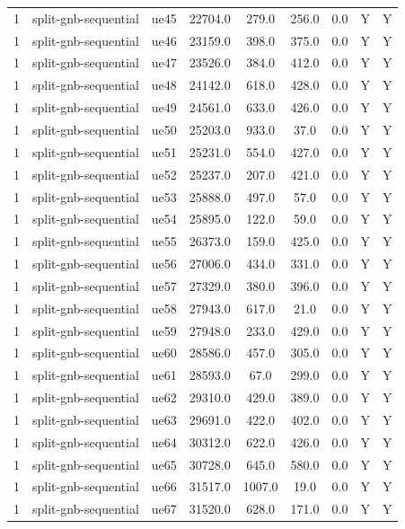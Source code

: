 \begin{table}[ht]
\begin{tabular}{|c|c|c|c|c|c|c|c|c|}
1 & split-gnb-sequential & ue45 & 22704.0 & 279.0 & 256.0 & 0.0 & Y & Y \\
1 & split-gnb-sequential & ue46 & 23159.0 & 398.0 & 375.0 & 0.0 & Y & Y \\
1 & split-gnb-sequential & ue47 & 23526.0 & 384.0 & 412.0 & 0.0 & Y & Y \\
1 & split-gnb-sequential & ue48 & 24142.0 & 618.0 & 428.0 & 0.0 & Y & Y \\
1 & split-gnb-sequential & ue49 & 24561.0 & 633.0 & 426.0 & 0.0 & Y & Y \\
1 & split-gnb-sequential & ue50 & 25203.0 & 933.0 & 37.0 & 0.0 & Y & Y \\
1 & split-gnb-sequential & ue51 & 25231.0 & 554.0 & 427.0 & 0.0 & Y & Y \\
1 & split-gnb-sequential & ue52 & 25237.0 & 207.0 & 421.0 & 0.0 & Y & Y \\
1 & split-gnb-sequential & ue53 & 25888.0 & 497.0 & 57.0 & 0.0 & Y & Y \\
1 & split-gnb-sequential & ue54 & 25895.0 & 122.0 & 59.0 & 0.0 & Y & Y \\
1 & split-gnb-sequential & ue55 & 26373.0 & 159.0 & 425.0 & 0.0 & Y & Y \\
1 & split-gnb-sequential & ue56 & 27006.0 & 434.0 & 331.0 & 0.0 & Y & Y \\
1 & split-gnb-sequential & ue57 & 27329.0 & 380.0 & 396.0 & 0.0 & Y & Y \\
1 & split-gnb-sequential & ue58 & 27943.0 & 617.0 & 21.0 & 0.0 & Y & Y \\
1 & split-gnb-sequential & ue59 & 27948.0 & 233.0 & 429.0 & 0.0 & Y & Y \\
1 & split-gnb-sequential & ue60 & 28586.0 & 457.0 & 305.0 & 0.0 & Y & Y \\
1 & split-gnb-sequential & ue61 & 28593.0 & 67.0 & 299.0 & 0.0 & Y & Y \\
1 & split-gnb-sequential & ue62 & 29310.0 & 429.0 & 389.0 & 0.0 & Y & Y \\
1 & split-gnb-sequential & ue63 & 29691.0 & 422.0 & 402.0 & 0.0 & Y & Y \\
1 & split-gnb-sequential & ue64 & 30312.0 & 622.0 & 426.0 & 0.0 & Y & Y \\
1 & split-gnb-sequential & ue65 & 30728.0 & 645.0 & 580.0 & 0.0 & Y & Y \\
1 & split-gnb-sequential & ue66 & 31517.0 & 1007.0 & 19.0 & 0.0 & Y & Y \\
1 & split-gnb-sequential & ue67 & 31520.0 & 628.0 & 171.0 & 0.0 & Y & Y \\

\end{tabular}
\end{table}
